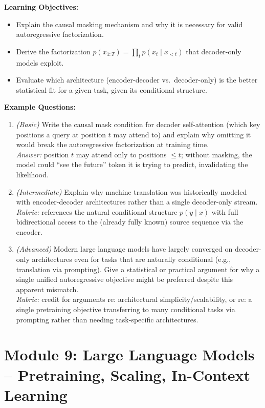 \documentclass[11pt]{article}
\begin{document}
\textbf{Learning Objectives:}
\begin{itemize}
  \item Explain the causal masking mechanism and why it is necessary for valid autoregressive factorization.
  \item Derive the factorization $p(x_{1:T}) = \prod_t p(x_t \mid x_{<t})$ that decoder-only models exploit.
  \item Evaluate which architecture (encoder-decoder vs.\ decoder-only) is the better statistical fit for a given task, given its conditional structure.
\end{itemize}

\textbf{Example Questions:}
\begin{enumerate}
  \item \textit{(Basic)} Write the causal mask condition for decoder self-attention (which key positions a query at position $t$ may attend to) and explain why omitting it would break the autoregressive factorization at training time. \\
  \textit{Answer:} position $t$ may attend only to positions $\le t$; without masking, the model could ``see the future'' token it is trying to predict, invalidating the likelihood.
  \item \textit{(Intermediate)} Explain why machine translation was historically modeled with encoder-decoder architectures rather than a single decoder-only stream. \\
  \textit{Rubric:} references the natural conditional structure $p(y\mid x)$ with full bidirectional access to the (already fully known) source sequence via the encoder.
  \item \textit{(Advanced)} Modern large language models have largely converged on decoder-only architectures even for tasks that are naturally conditional (e.g., translation via prompting). Give a statistical or practical argument for why a single unified autoregressive objective might be preferred despite this apparent mismatch. \\
  \textit{Rubric:} credit for arguments re: architectural simplicity/scalability, or re: a single pretraining objective transferring to many conditional tasks via prompting rather than needing task-specific architectures.
\end{enumerate}
\section{Module 9: Large Language Models -- Pretraining, Scaling, In-Context Learning}
\end{document}

